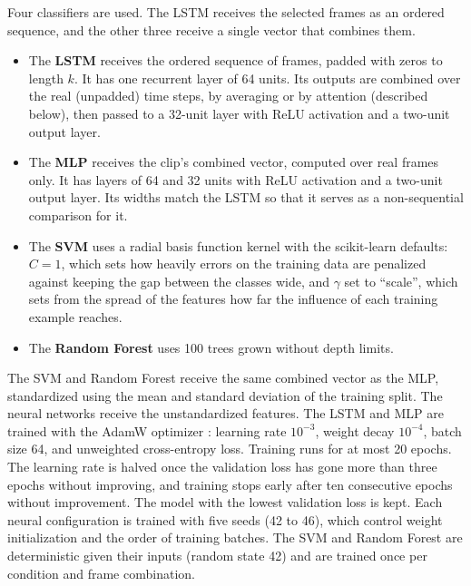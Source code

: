 Four classifiers are used. The LSTM receives the selected frames as an ordered sequence, and the other three receive a single vector that combines them.

\begin{itemize}
   \item The \textbf{LSTM} \cite{hochreiter1997} receives the ordered sequence of frames, padded with zeros to length $k$. It has one recurrent layer of 64 units. Its outputs are combined over the real (unpadded) time steps, by averaging or by attention (described below), then passed to a 32-unit layer with ReLU activation and a two-unit output layer.
   \item The \textbf{MLP} receives the clip's combined vector, computed over real frames only. It has layers of 64 and 32 units with ReLU activation and a two-unit output layer. Its widths match the LSTM so that it serves as a non-sequential comparison for it.
   \item The \textbf{SVM} \cite{cortes1995} uses a radial basis function kernel with the scikit-learn defaults: $C = 1$, which sets how heavily errors on the training data are penalized against keeping the gap between the classes wide, and $\gamma$ set to ``scale'', which sets from the spread of the features how far the influence of each training example reaches.
   \item The \textbf{Random Forest} \cite{breiman2001} uses 100 trees grown without depth limits.
\end{itemize}

The SVM and Random Forest receive the same combined vector as the MLP, standardized using the mean and standard deviation of the training split. The neural networks receive the unstandardized features. The LSTM and MLP are trained with the AdamW optimizer \cite{loshchilov2019}: learning rate $10^{-3}$, weight decay $10^{-4}$, batch size 64, and unweighted cross-entropy loss. Training runs for at most 20 epochs. The learning rate is halved once the validation loss has gone more than three epochs without improving, and training stops early after ten consecutive epochs without improvement. The model with the lowest validation loss is kept. Each neural configuration is trained with five seeds (42 to 46), which control weight initialization and the order of training batches. The SVM and Random Forest are deterministic given their inputs (random state 42) and are trained once per condition and frame combination.


